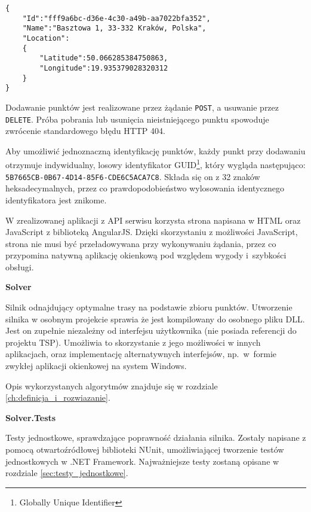 \begin{verbatim}
{  
    "Id":"fff9a6bc-d36e-4c30-a49b-aa7022bfa352",
    "Name":"Basztowa 1, 33-332 Kraków, Polska",
    "Location": 
    {  
        "Latitude":50.066285384750863,
        "Longitude":19.935379028320312
    }
}
\end{verbatim}

Dodawanie punktów jest realizowane przez żądanie \texttt{POST}, a usuwanie przez \texttt{DELETE}. Próba pobrania lub usunięcia nieistniejącego punktu spowoduje zwrócenie standardowego błędu HTTP 404. 

Aby umożliwić jednoznaczną identyfikację punktów, każdy punkt przy dodawaniu otrzymuje indywidualny, losowy identyfikator GUID\footnote{Globally Unique Identifier}, który wygląda następująco: \texttt{5B7665CB-0B67-4D14-85F6-CDE6C5ACA7C8}. Składa się on z 32 znaków heksadecymalnych, przez co prawdopodobieństwo wylosowania identycznego identyfikatora jest znikome. 

W zrealizowanej aplikacji z API serwisu korzysta strona napisana w HTML oraz JavaScript z biblioteką AngularJS. Dzięki skorzystaniu z możliwości JavaScript, strona nie musi być przeładowywana przy wykonywaniu żądania, przez co przypomina natywną aplikację okienkową pod względem wygody i~szybkości obsługi.

\medskip

\noindent \textbf{Solver}

Silnik odnajdujący optymalne trasy na podstawie zbioru punktów. Utworzenie silnika w osobnym projekcie sprawia że jest kompilowany do osobnego pliku DLL. Jest on zupełnie niezależny od interfejsu użytkownika (nie posiada referencji do projektu TSP). Umożliwia to skorzystanie z jego możliwości w innych aplikacjach, oraz implementację alternatywnych interfejsów, np.~w~formie zwykłej aplikacji okienkowej na system Windows.

Opis wykorzystanych algorytmów znajduje się w rozdziale \ref{ch:definicja_i_rozwiazanie}.

\medskip

\noindent \textbf{Solver.Tests}

Testy jednostkowe, sprawdzające poprawność działania silnika. Zostały napisane z pomocą otwartoźródłowej biblioteki NUnit, umożliwiającej tworzenie testów jednostkowych w .NET Framework. Najważniejsze testy zostaną opisane w rozdziale \ref{sec:testy_jednostkowe}.